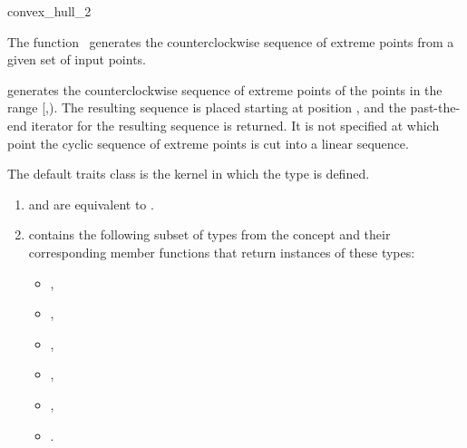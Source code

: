 

\begin{ccRefFunction}{convex_hull_2}  %

\ccDefinition
  
The function \ccRefName\ generates the counterclockwise sequence of extreme
points from a given set of input points.  


            {generates the counterclockwise sequence of extreme points
            of the points in the range [,).
            The resulting sequence is placed starting at position
            , and the past-the-end iterator for the resulting
            sequence is returned. It is not specified at which point the
            cyclic sequence of extreme points is cut into a linear sequence.
            \ccPrecond{ %
            The source range [\ccc{first},\ccc{beyond}) does not contain
            \ccc{result}.}}

The default traits class  is the kernel in which
the type  is defined. 

\begin{enumerate}
   \item    {} and 
            are equivalent to .
   \item    {} contains the following subset of types from
            the concept  and their corresponding member
            functions that return instances of these types:
            \begin{itemize}
                \item {},
                \item {},
		\item {},
                \item {}, 
                \item {},
                \item {}.
            \end{itemize}
\end{enumerate}



\end{ccRefFunction}
